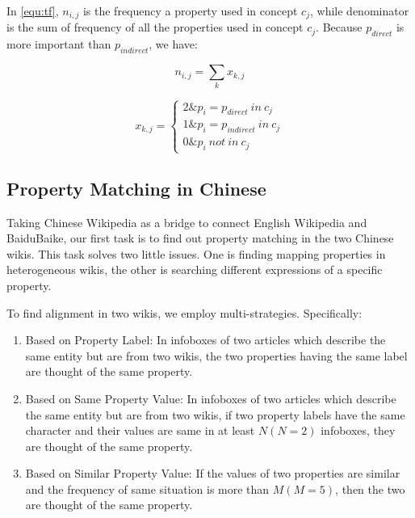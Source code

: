\documentclass[runningheads,a4paper]{llncs}
\begin{document}
In \ref{equ:tf}, $n_{i,j}$ is the frequency a property used in concept $c_{j}$, while denominator is the sum of frequency of all the properties used in concept $c_{j}$. Because $p_{direct}$ is more important than $p_{indirect}$, we have:

\begin{equation}
n_{i,j} = {\sum_{k}{x_{k,j}}}
\end{equation}

\begin{equation}
x_{k,j} =
\left\{\begin{matrix}
2 \& p_i = p_{direct} \ in \ c_j\\
1 \& p_i = p_{indirect} \ in \ c_j\\
0 \& p_i \ not \ in \ c_j
\end{matrix}\right.
\end{equation}

\subsection{Property Matching in Chinese}
\label{sec:similar-property}
Taking Chinese Wikipedia as a bridge to connect English Wikipedia and BaiduBaike, our first task is to find out property matching in the two Chinese wikis. This task solves two little issues. One is finding mapping properties in heterogeneous wikis, the other is searching different expressions of a specific property.

To find alignment in two wikis, we employ multi-strategies. Specifically:
\begin{enumerate}[1]
\item Based on Property Label: In infoboxes of two articles which describe the same entity but are from two wikis, the two properties having the same label are thought of the same property. 
\item Based on Same Property Value: In infoboxes of two articles which describe the same entity but are from two wikis, if two property labels have the same character and their values are same in at least $N(N=2)$ infoboxes, they are thought of the same property. 
\item Based on Similar Property Value: If the values of two properties are similar and the frequency of same situation is more than $M(M=5)$, then the two are thought of the same property.
\end{enumerate}
\end{document}
